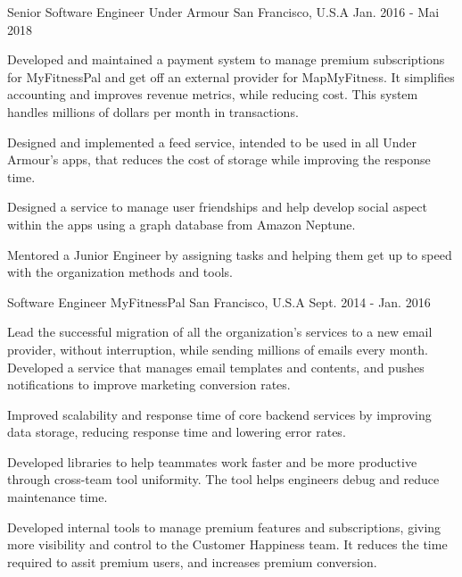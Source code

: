 \begin{cventries}
  \cventry
    {Senior Software Engineer}
    {Under Armour}
    {San Francisco, U.S.A}
    {Jan. 2016 - Mai 2018}
    {
      \begin{cvitems}
	\item{Developed and maintained a payment system to manage premium subscriptions for MyFitnessPal and get off an external provider for MapMyFitness. It simplifies accounting and improves revenue metrics, while reducing cost. This system handles millions of dollars per month in transactions. }
	\item {Designed and implemented a feed service, intended to be used in all Under Armour's apps, that reduces the cost of storage while improving the response time.}
        \item {Designed a service to manage user friendships and help develop social aspect within the apps using a graph database from Amazon Neptune. }	
	\item {Mentored a Junior Engineer by assigning tasks and helping them get up to speed with the organization methods and tools.}
      \end{cvitems}
    }
    
  \cventry
    {Software Engineer}
    {MyFitnessPal}
    {San Francisco, U.S.A}
    {Sept. 2014 - Jan. 2016}
    {
      \begin{cvitems}	
        \item {Lead the successful migration of all the organization's services to a new email provider, without interruption, while sending millions of emails every month. Developed a service that manages email templates and contents, and pushes notifications to improve marketing conversion rates.}
        \item{Improved scalability and response time of core backend services by improving data storage, reducing response time and lowering error rates.}
        \item {Developed libraries to help teammates work faster and be more productive through cross-team tool uniformity. The tool helps engineers debug and reduce maintenance time.}
        \item{Developed internal tools to manage premium features and subscriptions, giving more visibility and control to the Customer Happiness team. It reduces the time required to assit premium users, and increases premium conversion.}
      \end{cvitems}
    }



\end{cventries}
